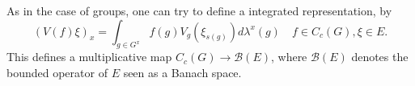 As in the case of groups, one can try to define a integrated representation, by 
\[ (V(f)\xi )_x = \int_{g\in G^x} f(g) V_g (\xi_{s(g)}) d\lambda^x (g) \quad f \in C_c(G) , \xi \in E.\]
This defines a multiplicative map $C_c(G)\rightarrow \mathcal B(E)$, where $\mathcal B (E)$ denotes the bounded operator of $E$ seen as a Banach space. 


